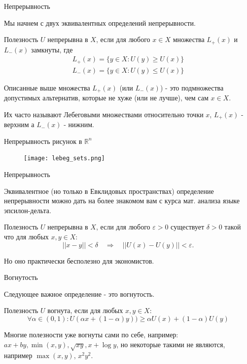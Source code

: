\documentclass{beamer}
\begin{document}
\begin{frame}{Непрерывность}

Мы начнем с двух эквивалентных определений непрерывности.

\begin{definition}
Полезность $U$ \alert{непрерывна} в $X$, если для любого $x \in X$ множества $L_{+}(x)$ и $L_{-}(x)$ замкнуты, где
\begin{gather*} L_{+}(x) = \{y \in X: U(y) \geqslant U(x)\}\\
 L_{-}(x) = \{y \in X: U(y) \leqslant U(x)\}\end{gather*}
\end{definition}

Описанные выше множества $L_{+}(x)$ (или $L_{-}(x)$) - это подмножества допустимых альтернатив, которые не хуже (или не лучше), чем сам $x \in X$. 

Их часто называют \alert{Лебеговыми множествами} относительно точки $x$, $L_{+}(x)$ - верхним а $L_{-}(x)$ - нижним.

\end{frame}

\begin{frame}{Непрерывность}
\centering
рисунок в $\mathbb{R}^{n}$
\begin{figure}[hbt]
\centering
\texttt{[image: lebeg\_sets.png]}
\end{figure}

\end{frame}

\begin{frame}{Непрерывность}

Эквивалентное (но только в Евклидовых пространствах) определение непрерывности можно дать на более знакомом вам с курса мат. анализа языке эпсилон-дельта.

\begin{definition} Полезность $U$ \alert{непрерывна} в $X$, если для любого $\varepsilon > 0$ существует $\delta >0$ такой что для любых $x, y \in X$: $$ ||x - y|| < \delta \quad \Rightarrow \quad ||U(x) - U(y)|| < \varepsilon.$$	
\end{definition}

Но оно практически бесполезно для экономистов.

\end{frame}

\begin{frame}{Вогнутость}

Следующее важное определение - это вогнутость.

\begin{definition}
Полезность $U$ \alert{вогнута}, если для любых $x, y \in X$: 
$$ \forall \alpha \in (0,1): U(\alpha x + (1-\alpha) y)) \geqslant \alpha U(x) + (1-\alpha) U(y)$$
\end{definition}

Многие полезности уже вогнуты сами по себе, например: $ax + by, \min(x,y), \sqrt{xy}, x + \log y$, но некоторые такими не являются, например $\max(x,y)$, $x^2y^2$.

\end{frame}
\end{document}
